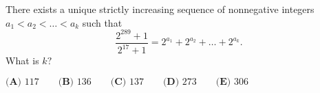 There exists a unique strictly increasing sequence of nonnegative integers $a_1 < a_2 < … < a_k$ such that \[\frac{2^{289}+1}{2^{17}+1} = 2^{a_1} + 2^{a_2} + … + 2^{a_k}.\] What is $k?$

$\textbf{(A) } 117 \qquad \textbf{(B) } 136 \qquad \textbf{(C) } 137 \qquad \textbf{(D) } 273 \qquad \textbf{(E) } 306$